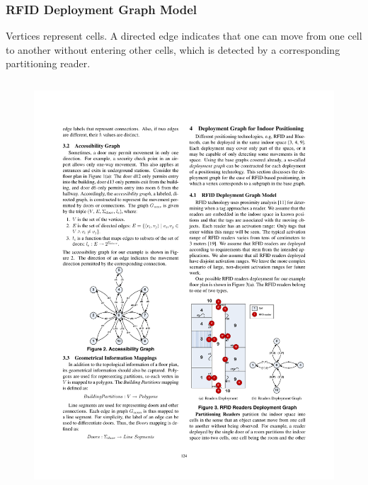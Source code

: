 
\begin{frame}
\frametitle{RFID Deployment Graph Model}

\small{Vertices represent cells. A directed edge indicates that one can move from one cell to another without entering other cells, which is detected by a corresponding partitioning reader.}

\begin{columns}[c]

    \begin{figure}[tb]
      \includegraphics[width=\columnwidth]{figures/2-1/2-1-4.pdf}
    \end{figure}



\end{columns}
\end{frame}
